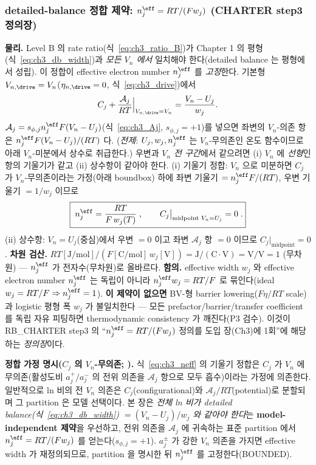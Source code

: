 \subsubsection{detailed-balance 정합 제약: $n_j^{\eff}=RT/(Fw_j)$ (CHARTER step3 정의장)}\label{sec:ch3_neff}
\textbf{물리.} Level B 의 rate ratio(식~\eqref{eq:ch3_ratio_B})가 Chapter 1 의 평형(식~\eqref{eq:ch3_db_width})과
\emph{모든 $V_n$ 에서} 일치해야 한다(detailed balance 는 평형에서 성립). 이 정합이 effective electron number
$n_j^{\eff}$ 를 \emph{고정}한다. 기본형 $V_{n,\drive}=V_n$($\eta_{n,\drive}=0$, 식~\eqref{eq:ch3_drive})에서
\begin{equation}
C_j+\frac{\mathcal A_j}{RT}\Big|_{V_{n,\drive}=V_n}=\frac{V_n-U_j}{w_j}.
\label{eq:ch3_dbmatch}
\end{equation}
$\mathcal A_j=s_{\phi,j}n_j^{\eff}F(V_n-U_j)$(식~\eqref{eq:ch3_Aj}, $s_{\phi,j}=+1$)를 넣으면 좌변의 $V_n$-의존
항은 $n_j^{\eff}F(V_n-U_j)/(RT)$ 다. (\emph{전제}: $U_j,w_j,n_j^{\eff}$ 는 $V_n$-무의존인 온도 함수이므로 아래
$V_n$-미분에서 상수로 취급한다.) 우변과 \emph{$V_n$ 전 구간}에서 같으려면 (i) $V_n$ 에 \emph{선형}인 항의
기울기가 같고 (ii) 상수항이 같아야 한다. (i) 기울기 정합: $V_n$ 으로 미분하면 $C_j$ 가 $V_n$-무의존이라는
가정(아래 boundbox) 하에 좌변 기울기 $=n_j^{\eff}F/(RT)$, 우변 기울기 $=1/w_j$ 이므로
\begin{equation}
\boxed{\;n_j^{\eff}=\frac{RT}{F\,w_j(T)}\;,\qquad C_j\big|_{\text{midpoint }V_n=U_j}=0\;.}
\label{eq:ch3_neff}
\end{equation}
(ii) 상수항: $V_n=U_j$(중심)에서 우변 $=0$ 이고 좌변 $\mathcal A_j$ 항 $=0$ 이므로 $C_j|_{\text{midpoint}}=0$.
\textbf{차원 검산.} $RT[\mathrm{J/mol}]/(F[\mathrm{C/mol}]\,w_j[\mathrm V])=\mathrm{J/(C\cdot V)}=\mathrm{V/V}=1$
(무차원) — $n_j^{\eff}$ 가 전자수(무차원)로 올바르다. \textbf{함의.} effective width $w_j$ 와 effective electron
number $n_j^{\eff}$ 는 독립이 아니라 $n_j^{\eff}w_j=RT/F$ 로 묶인다(ideal $w_j=RT/F\Rightarrow n_j^{\eff}=1$).
\textbf{이 제약이 없으면} BV-형 barrier lowering($F\eta/RT$ scale)과 logistic 평형 폭 $w_j$ 가 불일치한다 —
모든 prefactor/barrier/transfer coefficient 를 독립 자유 피팅하면 thermodynamic consistency 가 깨진다(P3 검수).
이것이 RB\_CHARTER step3 의 ``$n_j^{\eff}=RT/(Fw_j)$ 정의를 도입 장(Ch3)에 1회''에 해당하는 \emph{정의장}이다.
\begin{boundbox}
\textbf{정합 가정 명시($C_j$ 의 $V_n$-무의존; ).} 식~\eqref{eq:ch3_neff} 의 기울기 정합은 $C_j$ 가 $V_n$
에 무의존(활성도비 $a_j^+/a_j^-$ 의 전위 의존을 $\mathcal A_j$ 항으로 모두 흡수)이라는 가정에 의존한다. 일반적으로
ln 비의 전 $V_n$ 의존은 $C_j$(configurational)와 $\mathcal A_j/RT$(potential)로 분할되며 그 partition 은 모델
선택이다. 본 장은 \emph{전체 ln 비가 detailed balance(식~\eqref{eq:ch3_db_width}) $=(V_n-U_j)/w_j$ 와 같아야
한다}는 \textbf{model-independent 제약}을 우선하고, 전위 의존을 $\mathcal A_j$ 에 귀속하는 표준 partition 에서
$n_j^{\eff}=RT/(Fw_j)$ 를 얻는다($s_{\phi,j}=+1$). $a_j^\pm$ 가 강한 $V_n$ 의존을 가지면 effective width 가
재정의되므로, partition 을 명시한 뒤 $n_j^{\eff}$ 를 고정한다(BOUNDED).
\end{boundbox}
